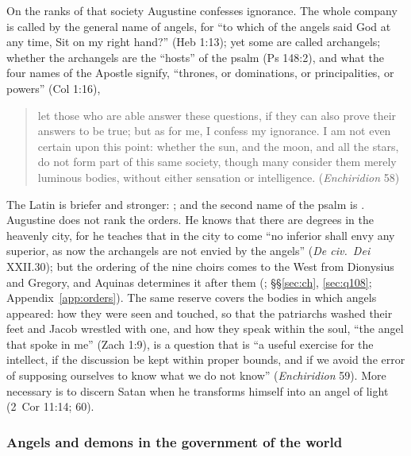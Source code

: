 On the ranks of that society Augustine confesses ignorance. The whole
company is called by the general name of angels, for ``to which of the
angels said God at any time, Sit on my right hand?'' (Heb 1:13); yet some
are called archangels; whether the archangels are the ``hosts'' of the
psalm (Ps 148:2), and what the four names of the Apostle signify,
``thrones, or dominations, or principalities, or powers'' (Col 1:16),
\begin{quote}
let those who are able answer these questions, if they can also prove
their answers to be true; but as for me, I confess my ignorance. I am not
even certain upon this point: whether the sun, and the moon, and all the
stars, do not form part of this same society, though many consider them
merely luminous bodies, without either sensation or intelligence.
(\emph{Enchiridion} 58)
\end{quote}
The Latin is briefer and stronger: ; and the
second name of the psalm is . Augustine does not rank the
orders. He knows that there are degrees in the heavenly city, for he
teaches that in the city to come ``no inferior shall envy any superior,
as now the archangels are not envied by the angels'' (\emph{De civ.\ Dei}
XXII.30); but the ordering of the nine choirs comes to the West from
Dionysius and Gregory, and Aquinas determines it after them (; \S\S\ref{sec:ch}, \ref{sec:q108}; Appendix~\ref{app:orders}).
The same reserve covers the bodies in which angels appeared: how they
were seen and touched, so that the patriarchs washed their feet and Jacob
wrestled with one, and how they speak within the soul, ``the angel that
spoke in me'' (Zach 1:9), is a question that is ``a useful exercise for
the intellect, if the discussion be kept within proper bounds, and if we
avoid the error of supposing ourselves to know what we do not know''
(\emph{Enchiridion} 59). More necessary is to discern Satan when he
transforms himself into an angel of light (2~Cor 11:14; 60).

\subsubsection{Angels and demons in the government of the world}\label{sec:aug-government}

